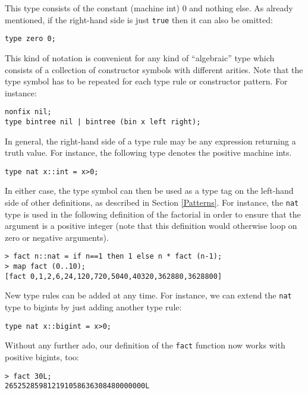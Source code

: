 \documentclass[a4paper,12pt]{article}
\begin{document}
This type consists of the constant (machine int) 0 and nothing else. As already mentioned, if the right-hand side is just \verb|true| then it can also be omitted:

\begin{lstlisting}
type zero 0;
\end{lstlisting}

This kind of notation is convenient for any kind of ``algebraic'' type which consists of a collection of constructor symbols with different arities. Note that the type symbol has to be repeated for each type rule or constructor pattern. For instance:

\begin{lstlisting}
nonfix nil;
type bintree nil | bintree (bin x left right);
\end{lstlisting}

In general, the right-hand side of a type rule may be any expression returning a truth value. For instance, the following type denotes the positive machine ints.

\begin{lstlisting}
type nat x::int = x>0;
\end{lstlisting}

In either case, the type symbol can then be used as a type tag on the left-hand side of other definitions, as described in Section \ref{Patterns}. For instance, the \verb|nat| type is used in the following definition of the factorial in order to ensure that the argument is a positive integer (note that this definition would otherwise loop on zero or negative arguments).

\begin{lstlisting}
> fact n::nat = if n==1 then 1 else n * fact (n-1);
> map fact (0..10);
[fact 0,1,2,6,24,120,720,5040,40320,362880,3628800]
\end{lstlisting}

New type rules can be added at any time. For instance, we can extend the \verb|nat| type to bigints by just adding another type rule:

\begin{lstlisting}
type nat x::bigint = x>0;
\end{lstlisting}

Without any further ado, our definition of the \verb|fact| function now works with positive bigints, too:

\begin{lstlisting}
> fact 30L;
265252859812191058636308480000000L
\end{lstlisting}
\end{document}
